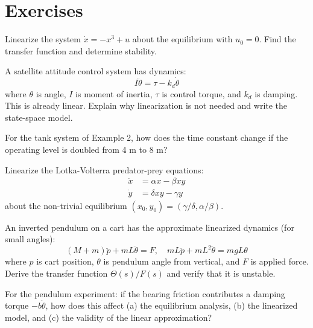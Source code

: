 \newpage
\section{Exercises}

\begin{exercise}
Linearize the system $\dot{x} = -x^3 + u$ about the equilibrium with $u_0 = 0$. Find the transfer function and determine stability.
\end{exercise}

\begin{exercise}
A satellite attitude control system has dynamics:
\begin{equation}
I\ddot{\theta} = \tau - k_d\dot{\theta}
\end{equation}
where $\theta$ is angle, $I$ is moment of inertia, $\tau$ is control torque, and $k_d$ is damping. This is already linear. Explain why linearization is not needed and write the state-space model.
\end{exercise}

\begin{exercise}
For the tank system of Example 2, how does the time constant change if the operating level is doubled from 4 m to 8 m?
\end{exercise}

\begin{exercise}
Linearize the Lotka-Volterra predator-prey equations:
\begin{align}
\dot{x} &= \alpha x - \beta xy \\
\dot{y} &= \delta xy - \gamma y
\end{align}
about the non-trivial equilibrium $(x_0, y_0) = (\gamma/\delta, \alpha/\beta)$.
\end{exercise}

\begin{exercise}
An inverted pendulum on a cart has the approximate linearized dynamics (for small angles):
\begin{equation}
(M+m)\ddot{p} + mL\ddot{\theta} = F, \quad mL\ddot{p} + mL^2\ddot{\theta} = mgL\theta
\end{equation}
where $p$ is cart position, $\theta$ is pendulum angle from vertical, and $F$ is applied force. Derive the transfer function $\Theta(s)/F(s)$ and verify that it is unstable.
\end{exercise}

\begin{exercise}
For the pendulum experiment: if the bearing friction contributes a damping torque $-b\dot{\theta}$, how does this affect (a) the equilibrium analysis, (b) the linearized model, and (c) the validity of the linear approximation?
\end{exercise}

